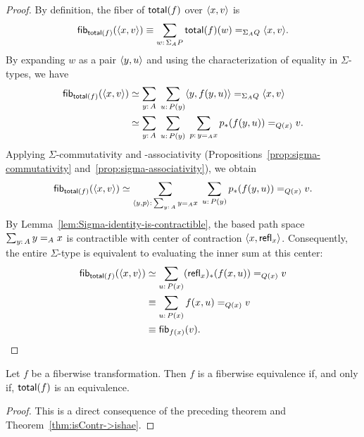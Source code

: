 \begin{proof}
    By definition, the fiber of $\mathsf{total}(f)$ over $\langle x,v\rangle$ is
    \[
        \fun{fib}_{\fun{total}(f)}(\dep{x,v})
        \equiv\sum_{w\colon\Sigma_AP}
            \fun{total}(f)(w)\eq{\Sigma_AQ}\dep{x,v}.
    \]
    By expanding $w$ as a pair $\langle y, u\rangle$ and using the characterization of equality in $\Sigma$-types, we have
    \begin{align*}
        \fun{fib}_{\fun{total}(f)}(\dep{x,v}) 
            &\simeq\sum_{y\colon A}\;\sum_{u\colon P(y)} 
            \dep{y,f(y,u)}\eq{\Sigma_AQ}\dep{x,v}\\
            &\simeq
                \sum_{y\colon A}\;
                \sum_{u\colon P(y)}\;
                \sum_{p\colon y\eq Ax}p_*(f(y,u))\eq{Q(x)}v.
    \end{align*}
    Applying $\Sigma$-commutativity and -associativity (Propositions~\ref{prop:sigma-commutativity} and~\ref{prop:sigma-associativity}), we obtain
    \[
        \fun{fib}_{\fun{total}(f)}(\dep{x, v})
        \simeq
        \sum_{\dep{y, p}\colon\sum_{y\colon A}y\eq Ax}\;
        \sum_{u\colon P(y)}p_*(f(y, u))\eq{Q(x)}v.
    \]
    By Lemma~\ref{lem:Sigma-identity-is-contractible}, the based path space $\sum_{y\colon A}y\eq Ax$ is contractible with center of contraction $\langle x, \mathsf{refl}_x\rangle$. Consequently, the entire $\Sigma$-type is equivalent to evaluating the inner sum at this center:
    \begin{align*}
        \fun{fib}_{\fun{total}(f)}(\dep{x,v})
            &\simeq\sum_{u\colon P(x)}
                (\fun{refl}_x)_*(f(x,u))\eq{Q(x)}v\\
            &\equiv\sum_{u\colon P(x)}f(x,u)\eq{Q(x)}v\\
            &\equiv\fun{fib}_{f(x)}(v).
    \end{align*}
    
\end{proof}

\begin{cor}\label{cor:total(f)-isequiv-iff-f-is-equiv}
    Let\/ $f$ be a fiberwise transformation. Then\/ $f$ is a fiberwise equivalence if, and only if, $\mathsf{total}(f)$ is an equivalence.
\end{cor}

\begin{proof}
    This is a direct consequence of the preceding theorem and Theorem~\ref{thm:isContr->ishae}.
    
\end{proof}

